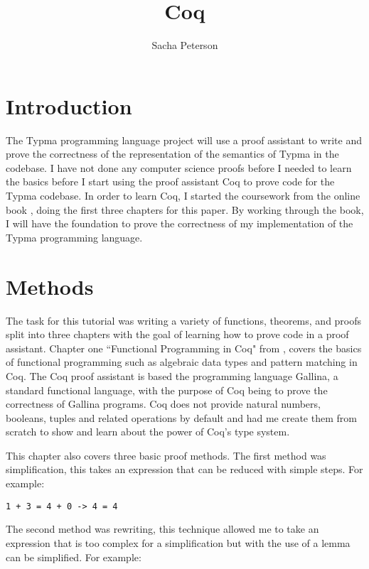 \documentclass[10pt,twocolumn]{article}
\title{Coq}
\author{Sacha Peterson}
\affiliation{Occidental College}
\begin{document}
\maketitle

\section{Introduction}

The Typma programming language project will use a proof assistant to write and prove the correctness of the representation of the semantics of Typma in the codebase. I have not done any computer science proofs before I needed to learn the basics before I start using the proof assistant Coq to prove code for the Typma codebase. In order to learn Coq, I started the coursework from the online book \textcite{Pierce2021Software}, doing the first three chapters for this paper. By working through the book, I will have the foundation to prove the correctness of my implementation of the Typma programming language.

\section{Methods}

The task for this tutorial was writing a variety of functions, theorems, and proofs split into three chapters with the goal of learning how to prove code in a proof assistant. Chapter one ``Functional Programming in Coq" from \textcite{Pierce2021Software}, covers the basics of functional programming such as algebraic data types and pattern matching in Coq. The Coq proof assistant is based the programming language Gallina, a standard functional language, with the purpose of Coq being to prove the correctness of Gallina programs. Coq does not provide natural numbers, booleans, tuples and related operations by default and \textcite{Pierce2021Software} had me create them from scratch to show and learn about the power of Coq's type system.

This chapter also covers three basic proof methods. The first method was simplification, this takes an expression that can be reduced with simple steps. For example:

\begin{lstlisting}
1 + 3 = 4 + 0 -> 4 = 4
\end{lstlisting}

The second method was rewriting, this technique allowed me to take an expression that is too complex for a simplification but with the use of a lemma can be simplified. For example:
\end{document}
